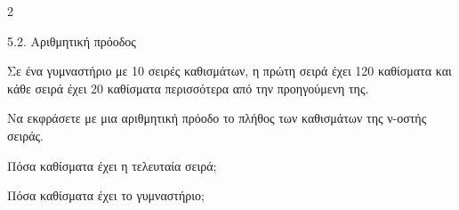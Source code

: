 \begin{ylh}{2}
    \item 5.2. Αριθμητική πρόοδος
\end{ylh}
Σε ένα γυμναστήριο με 10 σειρές καθισμάτων, η πρώτη σειρά έχει 120 καθίσματα και κάθε σειρά έχει 20 καθίσματα περισσότερα από την προηγούμενη της.
\begin{alist}
\item Να εκφράσετε με μια αριθμητική πρόοδο το πλήθος των καθισμάτων της ν-οστής σειράς.
\item Πόσα καθίσματα έχει η τελευταία σειρά;
\item Πόσα καθίσματα έχει το γυμναστήριο;
\end{alist}

